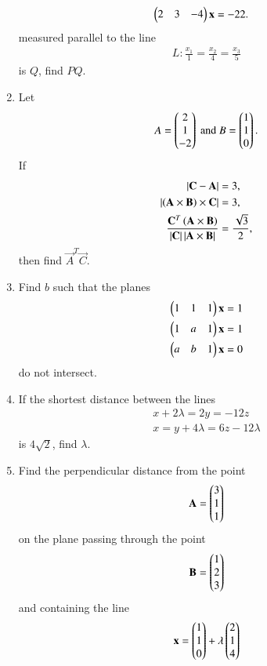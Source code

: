 \documentclass[journal,12pt,twocolumn]{IEEEtran}
\begin{document}
\begin{enumerate}[label=\arabic*.]
\begin{align}
\begin{pmatrix}2 & 3 & -4\end{pmatrix}\mathbf{x} &= -22.
\end{align}
%
measured parallel to the line
\begin{align}
L:\frac{x_1}{1}=
\frac{x_2}{4} = 
\frac{x_3}{5}
\end{align}
%
is $Q$, find $PQ$.
\item Let
\begin{equation}
A=\begin{pmatrix}2 \\ 1 \\ -2\end{pmatrix} \text{ and }
B=\begin{pmatrix}1 \\ 1 \\ 0\end{pmatrix}.
\end{equation}
%
If
\begin{align}
\left\vert\mathbf{C}-\mathbf{A}\right\vert &= 3,
\\
\left\vert\left(\mathbf{A}\times\mathbf{B}\right)\times\mathbf{C}\right\vert &= 3,
\\
\frac{\mathbf{C}^{T}\left(\mathbf{A}\times\mathbf{B}\right)}{\left\vert\mathbf{C}\right\vert\left\vert\mathbf{A}\times\mathbf{B}\right\vert} &= 
\frac{\sqrt{3}}{2},
\end{align}
then find $\vec{A}^{T}\vec{C}$.
\item Find $b$ such that the planes
\begin{align}
\begin{pmatrix}1 & 1 & 1\end{pmatrix}\mathbf{x} &= 1
\\
\begin{pmatrix}1 & a & 1\end{pmatrix}\mathbf{x} &= 1
\\
\begin{pmatrix}a & b & 1\end{pmatrix}\mathbf{x} &= 0
\end{align}
%
do not intersect.
\item If the shortest distance between the lines
\begin{align}
x + 2\lambda = 2y=-12z
\\
x=y+4\lambda=6z-12\lambda
\end{align}
is $4\sqrt{2}$, find $\lambda$.
\item Find the perpendicular distance from the point 
\begin{equation}
\mathbf{A}=\begin{pmatrix}3 \\ 1 \\ 1\end{pmatrix}
\end{equation}
%
on the plane passing through the point
\begin{equation}
\mathbf{B}=\begin{pmatrix}1 \\ 2 \\ 3\end{pmatrix}
\end{equation}
%
and containing the line
\begin{equation}
\vec{x}=\myvec{1 \\ 1 \\ 0}+\lambda\myvec{2 \\ 1 \\ 4}

\end{equation}
\end{enumerate}
\end{document}

